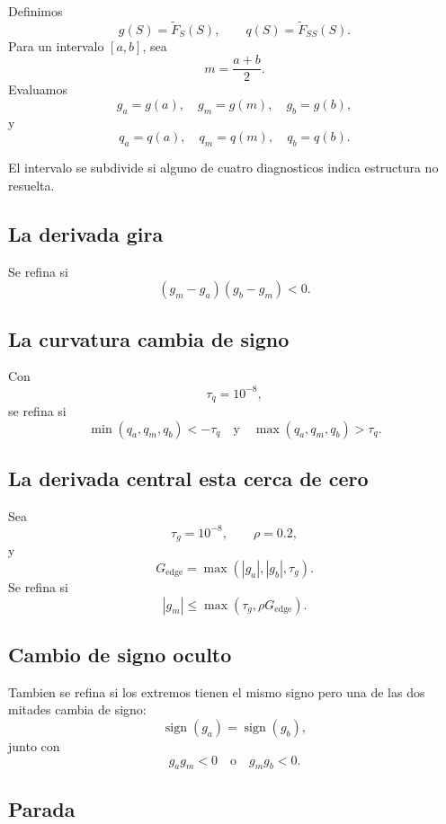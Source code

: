 \documentclass[11pt]{article}
\begin{document}
Definimos
\[
g(S)=\widetilde F_S(S),
\qquad
q(S)=\widetilde F_{SS}(S).
\]
Para un intervalo \([a,b]\), sea
\[
m=\frac{a+b}{2}.
\]
Evaluamos
\[
g_a=g(a),
\quad
g_m=g(m),
\quad
g_b=g(b),
\]
y
\[
q_a=q(a),
\quad
q_m=q(m),
\quad
q_b=q(b).
\]

El intervalo se subdivide si alguno de cuatro diagnosticos indica estructura
no resuelta.

\subsection{La derivada gira}

Se refina si
\begin{equation}
(g_m-g_a)(g_b-g_m)<0.
\label{eq:turning}
\end{equation}

\subsection{La curvatura cambia de signo}

Con
\[
\tau_q=10^{-8},
\]
se refina si
\begin{equation}
\min(q_a,q_m,q_b)<-\tau_q
\quad\text{y}\quad
\max(q_a,q_m,q_b)>\tau_q.
\label{eq:curvature-change}
\end{equation}

\subsection{La derivada central esta cerca de cero}

Sea
\[
\tau_g=10^{-8},
\qquad
\rho=0.2,
\]
y
\[
G_{\mathrm{edge}}
=
\max(|g_a|,|g_b|,\tau_g).
\]
Se refina si
\begin{equation}
|g_m|
\le
\max(
\tau_g,
\rho G_{\mathrm{edge}}
).
\label{eq:near-zero}
\end{equation}

\subsection{Cambio de signo oculto}

Tambien se refina si los extremos tienen el mismo signo pero una de las dos
mitades cambia de signo:
\[
\operatorname{sign}(g_a)
=
\operatorname{sign}(g_b),
\]
junto con
\[
g_ag_m<0
\quad\text{o}\quad
g_mg_b<0.
\]

\subsection{Parada}
\end{document}
